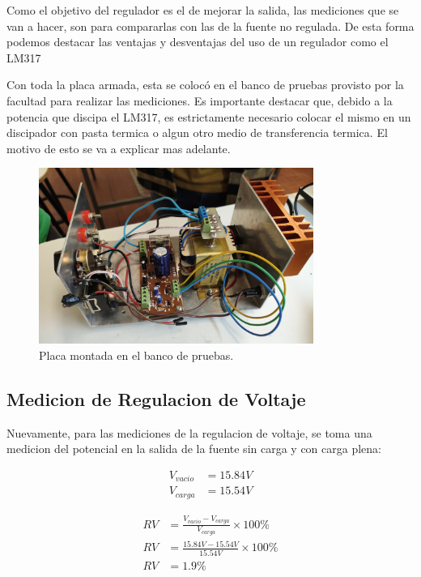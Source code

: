 \documentclass[chaptersright]{informeutn}
\begin{document}
      Como el objetivo del regulador es el de mejorar la salida, las mediciones que se van a hacer, son para
      compararlas con las de la fuente no regulada. De esta forma podemos destacar las ventajas y desventajas del uso
      de un regulador como el LM317

      Con toda la placa armada, esta se colocó en el banco de pruebas provisto por la facultad para realizar las
      mediciones. Es importante destacar que, debido a la potencia que discipa el LM317, es estrictamente necesario
      colocar el mismo en un discipador con pasta termica o algun otro medio de transferencia termica. El motivo de
      esto se va a explicar mas adelante.

      \begin{figure}[!h]
        \centering
        \includegraphics[width=0.8\textwidth]{pictures/reg_banco-prueb.jpeg}
        \caption{Placa montada en el banco de pruebas.}
      \end{figure}

      \subsection{Medicion de Regulacion de Voltaje}
        Nuevamente, para las mediciones de la regulacion de voltaje, se toma una medicion del potencial en la salida de
        la fuente sin carga y con carga plena:
        \begin{figure}[!h]
          \centering
          \begin{minipage}{0.4\textwidth}
            \begin{align*}
              V_{vacio} &= 15.84V\\[6pt]
              V_{carga} &= 15.54V
            \end{align*}
          \end{minipage}
          \begin{minipage}{0.4\textwidth}
            \begin{align*}
              RV &= \frac{V_{vacio} - V_{carga}}{V_{carga}} \times 100\%\\[6pt]
              RV &= \frac{15.84V - 15.54V}{15.54V} \times 100\%\\[6pt]
              RV &= 1.9\%
            \end{align*}
          \end{minipage}
        \end{figure}
\end{document}
